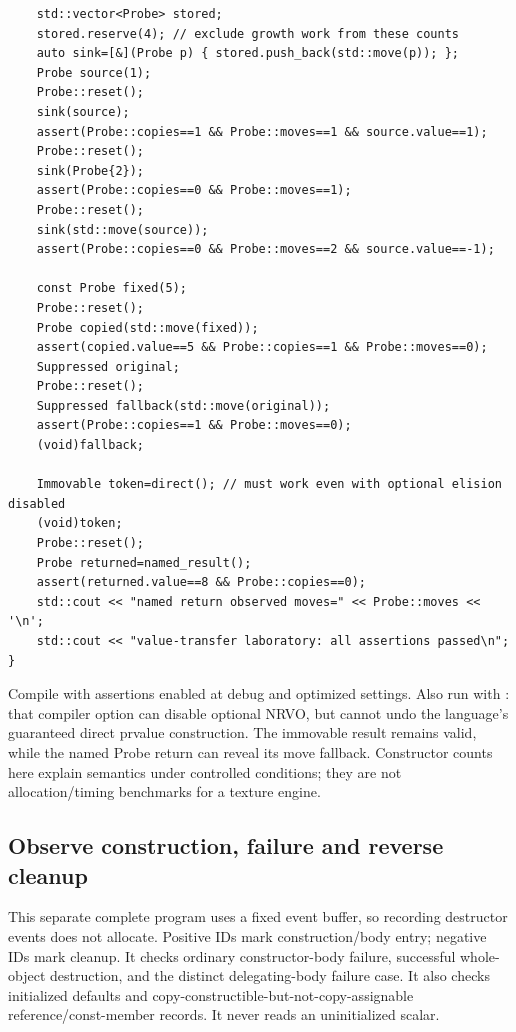 \begin{verbatim}
    std::vector<Probe> stored;
    stored.reserve(4); // exclude growth work from these counts
    auto sink=[&](Probe p) { stored.push_back(std::move(p)); };
    Probe source(1);
    Probe::reset();
    sink(source);
    assert(Probe::copies==1 && Probe::moves==1 && source.value==1);
    Probe::reset();
    sink(Probe{2});
    assert(Probe::copies==0 && Probe::moves==1);
    Probe::reset();
    sink(std::move(source));
    assert(Probe::copies==0 && Probe::moves==2 && source.value==-1);

    const Probe fixed(5);
    Probe::reset();
    Probe copied(std::move(fixed));
    assert(copied.value==5 && Probe::copies==1 && Probe::moves==0);
    Suppressed original;
    Probe::reset();
    Suppressed fallback(std::move(original));
    assert(Probe::copies==1 && Probe::moves==0);
    (void)fallback;

    Immovable token=direct(); // must work even with optional elision disabled
    (void)token;
    Probe::reset();
    Probe returned=named_result();
    assert(returned.value==8 && Probe::copies==0);
    std::cout << "named return observed moves=" << Probe::moves << '\n';
    std::cout << "value-transfer laboratory: all assertions passed\n";
}
\end{verbatim}

Compile with assertions enabled at debug and optimized settings. Also run with : that compiler option can disable optional NRVO, but cannot undo the language's guaranteed direct prvalue construction. The immovable result remains valid, while the named Probe return can reveal its move fallback. Constructor counts here explain semantics under controlled conditions; they are not allocation/timing benchmarks for a texture engine.

\subsection{Observe construction, failure and reverse cleanup}\label{01-foundations-i-ch004-observe-construction-failure-and-reverse-cleanup}

\hypertarget{01-foundations-i-ch004-observe-construction-failure-and-reverse-cleanup}{}

This separate complete program uses a fixed event buffer, so recording destructor events does not allocate. Positive IDs mark construction/body entry; negative IDs mark cleanup. It checks ordinary constructor-body failure, successful whole-object destruction, and the distinct delegating-body failure case. It also checks initialized defaults and copy-constructible-but-not-copy-assignable reference/const-member records. It never reads an uninitialized scalar.

